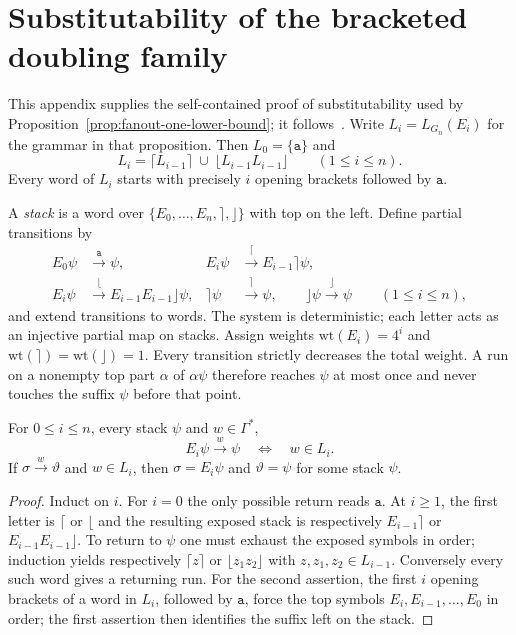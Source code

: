 \section{Substitutability of the bracketed doubling family}
\label{app:bracketed-substitutability}

This appendix supplies the self-contained proof of substitutability
used by Proposition~\ref{prop:fanout-one-lower-bound};
it follows~\cite[Appendix~C]{kuriyamaCFG}.
Write $L_i=L_{G_n}(E_i)$ for the grammar in that proposition. Then
$L_0=\{\mathtt a\}$ and
\[
 L_i=\lceil L_{i-1}\rceil \ \cup\
     \lfloor L_{i-1}L_{i-1}\rfloor
     \qquad (1\le i\le n).
\]
Every word of $L_i$ starts with precisely $i$ opening
brackets followed by $\mathtt a$.

A \emph{stack} is a word over
$\{E_0,\ldots,E_n,\rceil,\rfloor\}$ with top on the left.
Define partial transitions by
\[
\begin{aligned}
 E_0\psi&\xrightarrow{\mathtt a}\psi,&
 E_i\psi&\xrightarrow{\lceil}E_{i-1}\rceil\psi,\\
 E_i\psi&\xrightarrow{\lfloor}E_{i-1}E_{i-1}\rfloor\psi,&
 \rceil\psi&\xrightarrow{\rceil}\psi,\qquad
 \rfloor\psi\xrightarrow{\rfloor}\psi
 \qquad(1\le i\le n),
\end{aligned}
\]
and extend transitions to words. The system is deterministic;
each letter acts as an injective partial map on stacks.
Assign weights $\mathrm{wt}(E_i)=4^i$ and
$\mathrm{wt}(\rceil)=\mathrm{wt}(\rfloor)=1$.
Every transition strictly decreases the total weight.
A run on a nonempty top part $\alpha$ of $\alpha\psi$
therefore reaches $\psi$ at most once and never touches
the suffix $\psi$ before that point.

\begin{lemma}
\label{lem:app-runs}
For $0\le i\le n$, every stack $\psi$ and $w\in\Gamma^*$,
\[
 E_i\psi\xrightarrow{w}\psi
 \quad\Longleftrightarrow\quad w\in L_i.
\]
If $\sigma\xrightarrow{w}\vartheta$ and $w\in L_i$,
then $\sigma=E_i\psi$ and $\vartheta=\psi$
for some stack $\psi$.
\end{lemma}

\begin{proof}
Induct on $i$. For $i=0$ the only possible return
reads $\mathtt a$. At $i\ge1$, the first letter
is $\lceil$ or $\lfloor$ and the resulting
exposed stack is respectively $E_{i-1}\rceil$
or $E_{i-1}E_{i-1}\rfloor$.
To return to $\psi$ one must exhaust the exposed
symbols in order; induction yields respectively
$\lceil z\rceil$ or $\lfloor z_1z_2\rfloor$
with $z,z_1,z_2\in L_{i-1}$. Conversely
every such word gives a returning run.
For the second assertion, the first $i$ opening
brackets of a word in $L_i$, followed by
$\mathtt a$, force the top symbols
$E_i,E_{i-1},\ldots,E_0$ in order;
the first assertion then identifies the
suffix left on the stack.
\end{proof}

